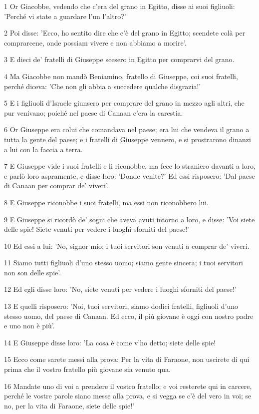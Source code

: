 \par 1 Or Giacobbe, vedendo che c'era del grano in Egitto, disse ai suoi figliuoli: 'Perché vi state a guardare l'un l'altro?'
\par 2 Poi disse: 'Ecco, ho sentito dire che c'è del grano in Egitto; scendete colà per comprarcene, onde possiam vivere e non abbiamo a morire'.
\par 3 E dieci de' fratelli di Giuseppe scesero in Egitto per comprarvi del grano.
\par 4 Ma Giacobbe non mandò Beniamino, fratello di Giuseppe, coi suoi fratelli, perché diceva: 'Che non gli abbia a succedere qualche disgrazia!'
\par 5 E i figliuoli d'Israele giunsero per comprare del grano in mezzo agli altri, che pur venivano; poiché nel paese di Canaan c'era la carestia.
\par 6 Or Giuseppe era colui che comandava nel paese; era lui che vendeva il grano a tutta la gente del paese; e i fratelli di Giuseppe vennero, e si prostrarono dinanzi a lui con la faccia a terra.
\par 7 E Giuseppe vide i suoi fratelli e li riconobbe, ma fece lo straniero davanti a loro, e parlò loro aspramente, e disse loro: 'Donde venite?' Ed essi risposero: 'Dal paese di Canaan per comprar de' viveri'.
\par 8 E Giuseppe riconobbe i suoi fratelli, ma essi non riconobbero lui.
\par 9 E Giuseppe si ricordò de' sogni che aveva avuti intorno a loro, e disse: 'Voi siete delle spie! Siete venuti per vedere i luoghi sforniti del paese!'
\par 10 Ed essi a lui: 'No, signor mio; i tuoi servitori son venuti a comprar de' viveri.
\par 11 Siamo tutti figliuoli d'uno stesso uomo; siamo gente sincera; i tuoi servitori non son delle spie'.
\par 12 Ed egli disse loro: 'No, siete venuti per vedere i luoghi sforniti del paese!'
\par 13 E quelli risposero: 'Noi, tuoi servitori, siamo dodici fratelli, figliuoli d'uno stesso uomo, del paese di Canaan. Ed ecco, il più giovane è oggi con nostro padre e uno non è più'.
\par 14 E Giuseppe disse loro: 'La cosa è come v'ho detto; siete delle spie!
\par 15 Ecco come sarete messi alla prova: Per la vita di Faraone, non uscirete di qui prima che il vostro fratello più giovane sia venuto qua.
\par 16 Mandate uno di voi a prendere il vostro fratello; e voi resterete qui in carcere, perché le vostre parole siano messe alla prova, e si vegga se c'è del vero in voi; se no, per la vita di Faraone, siete delle spie!'
